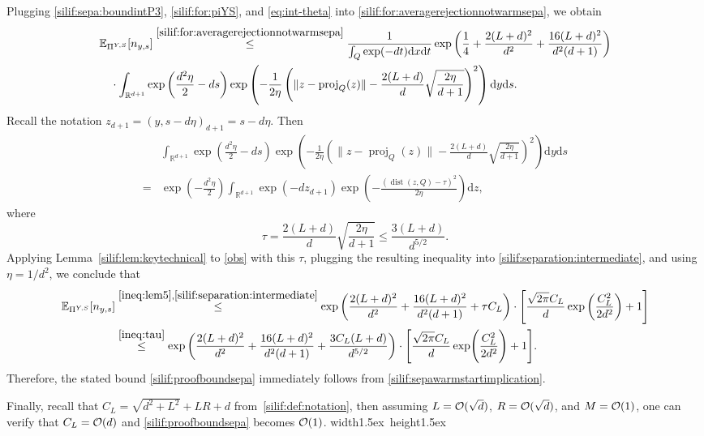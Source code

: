 \documentclass[11pt,letterpaper]{article}
\newcommand{\R}{\mathbb{R}}
\newcommand{\E}{\mathbb{E}}
\newcommand{\dist}{\operatorname{dist}}
\newcommand{\nn}{\nonumber}
\newcommand{\D}{\mathrm{d}}
\newcommand{\brac}[1]{\left( #1\right)}
\newcommand*{\QEDA}{\hfill\hbox{\vrule width1.5ex height1.5ex}}
\begin{document}
Plugging \eqref{silif:sepa:boundintP3}, \eqref{silif:for:piYS}, and \eqref{eq:int-theta} into \eqref{silif:for:averagerejectionnotwarmsepa}, we obtain
\begin{align}
\label{silif:separation:intermediate}
     &\E_{\Pi^{Y,S}} [n_{y,s}]
     \stackrel{\eqref{silif:for:averagerejectionnotwarmsepa}}\leq \frac{1}{\int_Q\exp(-dt) \D x \D t}\exp\brac{\frac{1}{4}+\frac{2(L+d)^2}{d^2}+\frac{16(L+d)^2}{d^2(d+1)}}\nonumber\\
     &\quad\cdot\int_{\R^{d+1}}\exp\brac{\frac{d^2\eta}{2} - ds }\exp\brac{-\frac{1}{2\eta}\left(\|z-\operatorname{proj}_Q(z)\| - \frac{2(L+d)}{d}\sqrt{\frac{2\eta}{d+1}}\right)^2 } \D y \D s.
\end{align}
Recall the notation $z_{d+1}=(y,s-d\eta)_{d+1}=s-d\eta$. Then
\begin{align}
  &\int_{\R^{d+1}}\exp\brac{\frac{d^2\eta}{2} - d s }\exp\brac{-\frac{1}{2\eta}\left(\|z-\operatorname{proj}_Q(z)\| - \frac{2(L+d)}{d}\sqrt{\frac{2\eta}{d+1}}\right)^2 } \D y \D s \nn\\
    =&\exp\brac{-\frac{d^2\eta}{2}}\int_{\R^{d+1}} \exp(-d z_{d+1}) 
    \exp\left(-\frac{\left(\dist(z,Q)- \tau\right)^2}{2\eta}\right)  \D z, \label{obs}
\end{align}
where
\begin{equation}\label{ineq:tau}
    \tau = \frac{2(L+d)}{d}\sqrt{\frac{2\eta}{d+1}} \leq \frac{3(L+d)}{d^{5/2}}.
\end{equation}
Applying Lemma~\ref{silif:lem:keytechnical} to \eqref{obs} with this $\tau$, plugging the resulting inequality into \eqref{silif:separation:intermediate}, and using $\eta=1/d^2$, we conclude that
\begin{align*}
 \E_{\Pi^{Y,S}} [n_{y,s}]
 &\stackrel{\eqref{ineq:lem5},\eqref{silif:separation:intermediate}}\leq \exp\brac{\frac{2(L+d)^2}{d^2}+\frac{16(L+d)^2}{d^2(d+1)} + \tau C_L}
 \cdot  \Biggl[ \frac{\sqrt{2\pi} C_L}{d}\exp \left(\frac{C_L^2}{2d^2}\right) + 1 \Biggr] \\
 &\stackrel{\eqref{ineq:tau}}\leq \exp\brac{\frac{2(L+d)^2}{d^2}+\frac{16(L+d)^2}{d^2(d+1)} + \frac{3C_L(L+d)}{d^{5/2}}} \cdot\Bigg[\frac{\sqrt{2\pi} C_L}{d}
\exp \Biggl(\frac{C_L^2}{2d^2}\Biggr)+1\Bigg].
\end{align*}
Therefore, the stated bound \eqref{silif:proofboundsepa} immediately follows from \eqref{silif:sepawarmstartimplication}.

Finally, recall that $C_L=\sqrt{d^2+L^2}+LR+d$ from~\eqref{silif:def:notation}, then assuming $L={\cal O}(\sqrt{d})$, $R={\cal O}(\sqrt{d})$, and $M={\cal O}(1)$, one can verify that $C_L={\cal O}(d)$ and \eqref{silif:proofboundsepa} becomes ${\cal O}(1)$.
\QEDA
\end{document}
